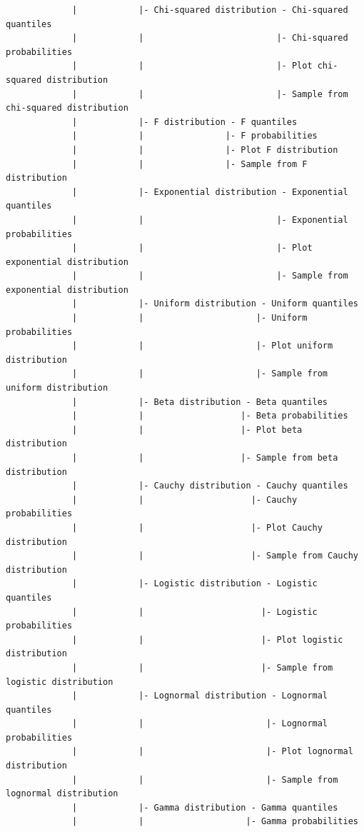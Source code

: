 \documentclass{article}%
\begin{document}
\begin{verbatim}
             |            |- Chi-squared distribution - Chi-squared quantiles
             |            |                          |- Chi-squared probabilities
             |            |                          |- Plot chi-squared distribution
             |            |                          |- Sample from chi-squared distribution
             |            |- F distribution - F quantiles
             |            |                |- F probabilities
             |            |                |- Plot F distribution
             |            |                |- Sample from F distribution
             |            |- Exponential distribution - Exponential quantiles
             |            |                          |- Exponential probabilities
             |            |                          |- Plot exponential distribution
             |            |                          |- Sample from exponential distribution
             |            |- Uniform distribution - Uniform quantiles
             |            |                      |- Uniform probabilities
             |            |                      |- Plot uniform distribution
             |            |                      |- Sample from uniform distribution
             |            |- Beta distribution - Beta quantiles
             |            |                   |- Beta probabilities
             |            |                   |- Plot beta distribution
             |            |                   |- Sample from beta distribution
             |            |- Cauchy distribution - Cauchy quantiles
             |            |                     |- Cauchy probabilities
             |            |                     |- Plot Cauchy distribution
             |            |                     |- Sample from Cauchy distribution
             |            |- Logistic distribution - Logistic quantiles
             |            |                       |- Logistic probabilities
             |            |                       |- Plot logistic distribution
             |            |                       |- Sample from logistic distribution
             |            |- Lognormal distribution - Lognormal quantiles
             |            |                        |- Lognormal probabilities
             |            |                        |- Plot lognormal distribution
             |            |                        |- Sample from lognormal distribution
             |            |- Gamma distribution - Gamma quantiles
             |            |                    |- Gamma probabilities

\end{verbatim}
\end{document}
